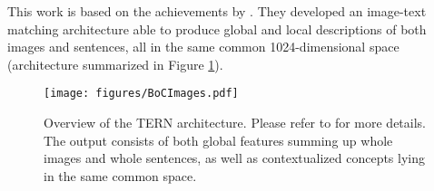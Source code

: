 \documentclass[conference]{IEEEtran}
\begin{document}
This work is based on the achievements by \cite{messina2020transformer}. They developed an image-text matching architecture able to produce global and local descriptions of both images and sentences, all in the same common 1024-dimensional space (architecture summarized in Figure \ref{fig:tern_architecture}).

\begin{figure}[t]
    \centering
    \texttt{[image: figures/BoCImages.pdf]}
  \caption{Overview of the TERN architecture. Please refer to \cite{messina2020transformer} for more details. The output consists of both global features summing up whole images and whole sentences, as well as contextualized concepts lying in the same common space.}
  \label{fig:tern_architecture} 
\end{figure}



\end{document}
